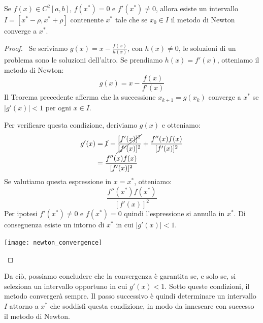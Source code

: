 \documentclass{article}
\begin{document}
\begin{theorem}
    Se $f(x)\in C^2[a,b]$, $f(x^*)=0$ e $f'(x^*)\neq0$, allora esiste un intervallo $I=[x^*-\rho,x^*+\rho]$ contenente
    $x^*$ tale che se $x_0\in I$ il metodo di Newton converge a  $x^*$.
\end{theorem}
\begin{proof}\leavevmode\
    Se scriviamo $g(x)=x-\frac{f(x)}{h(x)}$, con $h(x)\neq0$,
    le soluzioni di un problema sono le soluzioni dell'altro. Se prendiamo
    $h(x)=f'(x)$, otteniamo il metodo di Newton:
    $$g(x)=x-\frac{f(x)}{f'(x)}$$
    Il Teorema precedente afferma che la successione
    $x_{k+1}=g(x_k)$ converge a $x^*$ se $\left\lvert g'(x)\right\rvert<1$ per
    ogni $x\in I$. 

    Per verificare questa condizione, deriviamo $g(x)$ e otteniamo:
    \begin{equation*}
        \begin{aligned}
            g'(x)&=\cancel{1}-\cancel{\frac{[f'(x)]^2}{[f'(x)]^2}}+\frac{f''(x)f(x)}{[f'(x)]^2}
            \\ 
                 &=\frac{f''(x)f(x)}{[f'(x)]^2}
        \end{aligned}
    \end{equation*}
    Se valutiamo questa espressione in $x=x^*$, otteniamo:
    $$\frac{f''(x^*)f(x^*)}{[f'(x)]^2}$$
    Per ipotesi $f'(x^*)\neq0$ e $f(x^*)=0$ quindi l'espressione si annulla in
    $x^*$. Di conseguenza esiste un intorno di $x^*$ in cui $\left\lvert g'(x)\right\rvert<1$. 
    \begin{center}
        \texttt{[image: newton\_convergence]}
    \end{center}
\end{proof}

Da ciò, possiamo concludere che la convergenza è garantita se, e solo
se, si seleziona un intervallo opportuno in cui $g'(x)<1$. Sotto queste
condizioni, il metodo convergerà sempre. Il passo successivo è quindi
determinare un intervallo $I$ attorno a $x^*$ che soddisfi questa condizione,
in modo da innescare con successo il metodo di Newton.
\end{document}
